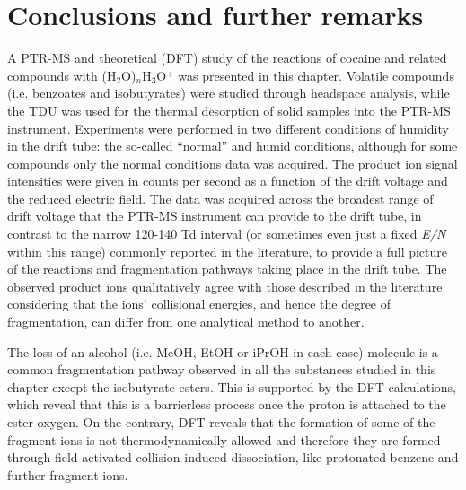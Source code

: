 \section{Conclusions and further remarks}
A PTR-MS and theoretical (DFT) study of the reactions of cocaine and related compounds with (H$_2$O)$_n$H$_3$O$^+$ was presented in this chapter.
%
Volatile compounds (i.e. benzoates and isobutyrates) were studied through headspace analysis, while the TDU was used for the thermal desorption of solid samples into the PTR-MS instrument.
%
Experiments were performed in two different conditions of humidity in the drift tube: the so-called ``normal'' and humid conditions, although for some compounds only the normal conditions data was acquired.
%
The product ion signal intensities were given in counts per second as a function of the drift voltage and the reduced electric field.
%
The data was acquired across the broadest range of drift voltage that the PTR-MS instrument can provide to the drift tube, in contrast to the narrow 120-140 Td interval (or sometimes even just a fixed \textit{E/N} within this range) commonly reported in the literature, to provide a full picture of the reactions and fragmentation pathways taking place in the drift tube.
%
The observed product ions qualitatively agree with those described in the literature considering that the ions' collisional energies, and hence the degree of fragmentation, can differ from one analytical method to another. 
% 



The loss of an alcohol (i.e. MeOH, EtOH or iPrOH in each case) molecule  is a common fragmentation pathway observed in all the substances studied in this chapter except the isobutyrate esters.
%
This is supported by the DFT calculations, which reveal that this is a barrierless process once the proton is attached to the %
ester oxygen.
%
On the contrary, DFT reveals that the formation of some of the fragment ions is not thermodynamically allowed and therefore they are formed through field-activated collision-induced dissociation, like protonated benzene and further fragment ions.

